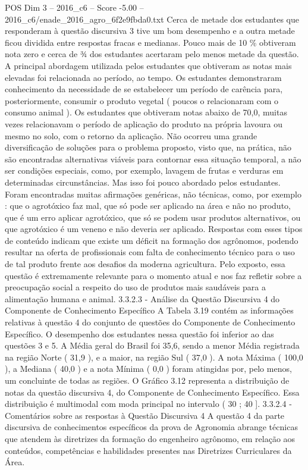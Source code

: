 \begin{textsample}{POS Dim 3 – 2016\_c6 – Score -5.00 – 2016\_c6/enade\_2016\_agro\_6f2e9fbda0.txt}
Cerca de metade dos estudantes que responderam à questão discursiva 3 tive um bom desempenho e a outra metade ficou dividida entre respostas fracas e medianas.
Pouco mais de 10 \% obtiveram nota zero e cerca de ¾ dos estudantes acertaram pelo menos metade da questão.
A principal abordagem utilizada pelos estudantes que obtiveram as notas mais elevadas foi relacionada ao período, ao tempo.
Os estudantes demonstraram conhecimento da necessidade de se estabelecer um período de carência para, posteriormente, consumir o produto vegetal ( poucos o relacionaram com o consumo animal ).
Os estudantes que obtiveram notas abaixo de 70,0, muitas vezes relacionavam o período de aplicação do produto na própria lavoura ou mesmo no solo, com o retorno da aplicação.
Não ocorreu uma grande diversificação de soluções para o problema proposto, visto que, na prática, não são encontradas alternativas viáveis para contornar essa situação temporal, a não ser condições especiais, como, por exemplo, lavagem de frutas e verduras em determinadas circunstâncias.
Mas isso foi pouco abordado pelos estudantes.
Foram encontradas muitas afirmações genéricas, não técnicas, como, por exemplo : que o agrotóxico faz mal, que só pode ser aplicado na área e não no produto, que é um erro aplicar agrotóxico, que só se podem usar produtos alternativos, ou que agrotóxico é um veneno e não deveria ser aplicado.
Respostas com esses tipos de conteúdo indicam que existe um déficit na formação dos agrônomos, podendo resultar na oferta de profissionais com falta de conhecimento técnico para o uso de tal produto frente aos desafios da moderna agricultura.
Pelo exposto, essa questão é extremamente relevante para o momento atual e nos faz refletir sobre a preocupação social a respeito do uso de produtos mais saudáveis para a alimentação humana e animal. 3.3.2.3 - Análise da Questão Discursiva 4 do Componente de Conhecimento Específico A Tabela 3.19 contém as informações relativas à questão 4 do conjunto de questões do Componente de Conhecimento Específico.
O desempenho dos estudantes nessa questão foi inferior ao das questões 3 e 5.
A Média geral do Brasil foi 35,6, sendo a menor Média registrada na região Norte ( 31,9 ), e a maior, na região Sul ( 37,0 ).
A nota Máxima ( 100,0 ), a Mediana ( 40,0 ) e a nota Mínima ( 0,0 ) foram atingidas por, pelo menos, um concluinte de todas as regiões.
O Gráfico 3.12 representa a distribuição de notas da questão discursiva 4, do Componente de Conhecimento Específico.
Essa distribuição é multimodal com moda principal no intervalo ( 30 ; 40 ]. 3.3.2.4 - Comentários sobre as respostas à Questão Discursiva 4 A questão 4 da parte discursiva de conhecimentos específicos da prova de Agronomia abrange técnicas que atendem às diretrizes da formação do engenheiro agrônomo, em relação aos conteúdos, competências e habilidades presentes nas Diretrizes Curriculares da Área.

\end{textsample}
